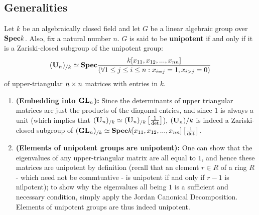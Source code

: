         \subsection{Generalities}
            \begin{definition} \label{def: unipotent_groups}
                Let $k$ be an algebraically closed field and let $G$ be a linear algebraic group over $\mathbf{Spec} k$. Also, fix a natural number $n$. $G$ is said to be \textbf{unipotent} if and only if it is a Zariski-closed subgroup of the unipotent group:
                    $$(\mathbf{U}_n)_{/k} \simeq \mathbf{Spec} \frac{k[x_{11}, x_{12}, ..., x_{nn}]}{(\forall 1 \leq j \leq i \leq n: x_{i = j} = 1, x_{i > j} = 0)}$$
                of upper-triangular $n \x n$ matrices with entries in $k$.
            \end{definition}
            \begin{remark} \label{remark: unipotent_groups_are_linear_algebraic_groups}
                \noindent
                \begin{enumerate}
                    \item \textbf{(Embedding into $\mathbf{GL}_n$):} Since the determinants of upper triangular matrices are just the products of the diagonal entries, and since $1$ is always a unit (which implies that $(\mathbf{U}_n)_{/k} \simeq (\mathbf{U}_n)_{/k}\left[\frac{1}{\det}\right]$), $(\mathbf{U}_n){/k}$ is indeed a Zariski-closed subgroup of $(\mathbf{GL}_n)_{/k} \simeq \mathbf{Spec} k[x_{11}, x_{12}, ..., x_{nn}]\left[\frac{1}{\det}\right]$. 
                    \item \textbf{(Elements of unipotent groups are unipotent):} One can show that the eigenvalues of any upper-triangular matrix are all equal to $1$, and hence these matrices are unipotent by definition (recall that an element $r \in R$ of a ring $R$ - which need not be commtuative - is unipotent if and only if $r - 1$ is nilpotent); to show why the eigenvalues all being $1$ is a sufficient and necessary condition, simply apply the Jordan Canonical Decomposition. Elements of unipotent groups are thus indeed unipotent.
                \end{enumerate}
            \end{remark}
